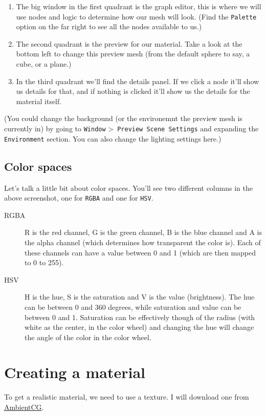 \documentclass{article}
\begin{document}
\begin{enumerate}
    \item The big window in the first quadrant is the graph editor, this is where we will use nodes and logic to determine how our mesh will look. (Find the \verb|Palette| option on the far right to see all the nodes available to us.)
    \item The second quadrant is the preview for our material. Take a look at the bottom left to change this preview mesh (from the default sphere to say, a cube, or a plane.)
    \item In the third quadrant we'll find the details panel. If we click a node it'll show us details for that, and if nothing is clicked it'll show us the details for the material itself.
\end{enumerate}
(You could change the background (or the environemnt the preview mesh is currently in) by going to \verb|Window| \textgreater\, \verb|Preview Scene Settings| and expanding the \verb|Environment| section. You can also change the lighting settings here.)

\subsection{Color spaces}


Let's talk a little bit about color spaces. You'll see two different columns in the above screenshot, one for \verb|RGBA| and one for \verb|HSV|.
\begin{description}
    \item[RGBA] R is the red channel, G is the green channel, B is the blue channel and A is the alpha channel (which determines how transparent the color is). Each of these channels can have a value between 0 and 1 (which are then mapped to 0 to 255). 
    \item[HSV] H is the hue, S is the saturation and V is the value (brightness). The hue can be between 0 and 360 degrees, while saturation and value can be between 0 and 1. Saturation can be effectively though of the radius (with white as the center, in the color wheel) and changing the hue will change the angle of the color in the color wheel.
\end{description}

\section{Creating a material}
To get a realistic material, we need to use a texture. I will download one from \href{https://ambientcg.com}{AmbientCG}.
\end{document}
